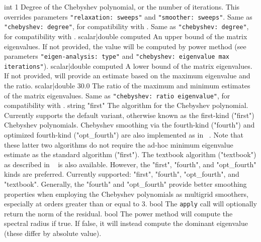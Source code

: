     {int}
    {1}
    {Degree of the Chebyshev polynomial, or the number of iterations. This
     overrides parameters {\tt "relaxation: sweeps"} and {\tt "smoother: sweeps"}.}
    {Same as {\tt "chebyshev: degree"}, for compatibility with \ifpack{}.}
    {Same as {\tt "chebyshev: degree"}, for compatibility with \ml{}.}
    {scalar|double}
    {computed}
    {An upper bound of the matrix eigenvalues. If not provided, the value will
     be computed by power method (see parameters {\tt "eigen-analysis: type"} and
     {\tt "chebyshev: eigenvalue max iterations"}).}
    {scalar|double}
    {computed}
    {A lower bound of the matrix eigenvalues.  If not provided, \ifpacktwo{}
     will provide an estimate based on the maximum eigenvalue and the ratio.}
    {scalar|double}
    {30.0}
    {The ratio of the maximum and minimum estimates of the matrix
     eigenvalues.}
    {Same as {\tt "chebyshev: ratio eigenvalue"}, for compatibility with \ml{}.}
    {string}
    {"first"}
    {The algorithm for the Chebyshev polynomial. Currently supports
     the default \ifpack{} variant, otherwise known as the first-kind ("first") Chebyshev polynomials.
     Chebyshev smoothing via the fourth-kind ("fourth") and optimized fourth-kind ("opt\_fourth")
     are also implemented as in ~\cite{Lottes2022}.
     Note that these latter two algorithms do not require the ad-hoc minimum eigenvalue estimate
     as the standard \ifpack{} algorithm ("first").
     The textbook algorithm ("textbook") as described in ~\cite{Saad2003} is also available.
     However, the "first", "fourth", and "opt\_fourth" kinds are preferred.
     Currently supported: "first", "fourth", "opt\_fourth", and "textbook".
     Generally, the "fourth" and "opt\_fourth" provide better smoothing properties
     when employing the Chebyshev polynomials as multigrid smoothers, especially at orders
     greater than or equal to 3.
    }
    {bool}
    {\false}
    {The \texttt{apply} call will optionally return the norm of the residual.}
    {bool}
    {\true}
    {The power method will compute the spectral radius if true. If false, it will
     instead compute the dominant eigenvalue (these differ by absolute value).}
